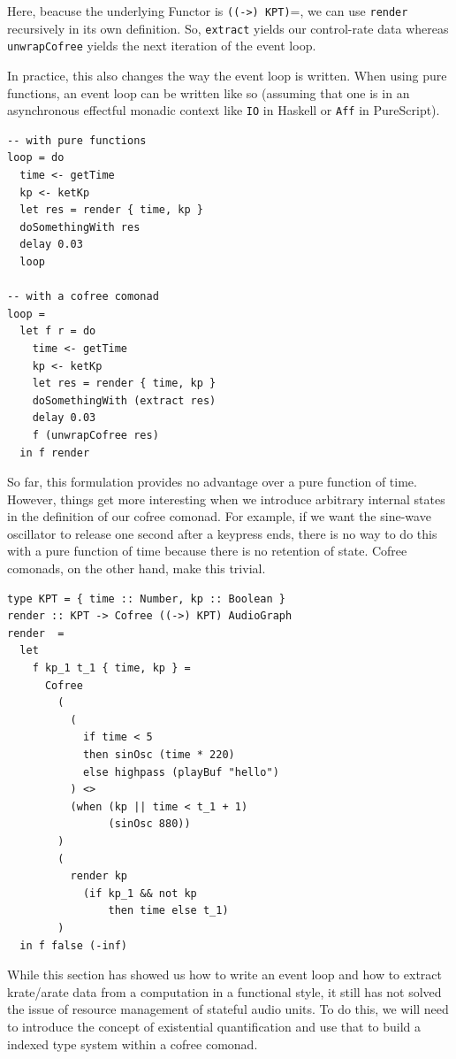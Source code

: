 \documentclass{article}
\begin{document}
Here, beacuse the underlying Functor is \texttt{((->) KPT)}=, we can use \texttt{render} recursively in its own definition. So, \texttt{extract} yields our control-rate data whereas \texttt{unwrap\-Cofree} yields the next iteration of the event loop.

In practice, this also changes the way the event loop is written. When using pure functions, an event loop can be written like so (assuming that one is in an asynchronous effectful monadic context like \texttt{IO} in Haskell or \texttt{Aff} in PureScript).

\lstset{language=Haskell, style=psstyle}
\begin{lstlisting}
-- with pure functions
loop = do
  time <- getTime
  kp <- ketKp
  let res = render { time, kp }
  doSomethingWith res
  delay 0.03
  loop

-- with a cofree comonad
loop =
  let f r = do
    time <- getTime
    kp <- ketKp
    let res = render { time, kp }
    doSomethingWith (extract res)
    delay 0.03
    f (unwrapCofree res)
  in f render
\end{lstlisting}

So far, this formulation provides no advantage over a pure function of time. However, things get more interesting when we introduce arbitrary internal states in the definition of our cofree comonad. For example, if we want the sine-wave oscillator to release one second after a keypress ends, there is no way to do this with a pure function of time because there is no retention of state. Cofree comonads, on the other hand, make this trivial.

\lstset{language=Haskell, style=psstyle}
\begin{lstlisting}
type KPT = { time :: Number, kp :: Boolean }
render :: KPT -> Cofree ((->) KPT) AudioGraph
render  =
  let
    f kp_1 t_1 { time, kp } =
      Cofree
        (
          (
            if time < 5
            then sinOsc (time * 220)
            else highpass (playBuf "hello")
          ) <>
          (when (kp || time < t_1 + 1)
                (sinOsc 880))
        )
        (
          render kp
            (if kp_1 && not kp
                then time else t_1)
        )
  in f false (-inf)
\end{lstlisting}

While this section has showed us how to write an event loop and how to extract krate/arate data from a computation in a functional style, it still has not solved the issue of resource management of stateful audio units. To do this, we will need to introduce the concept of existential quantification and use that to build a indexed type system within a cofree comonad.
\end{document}
